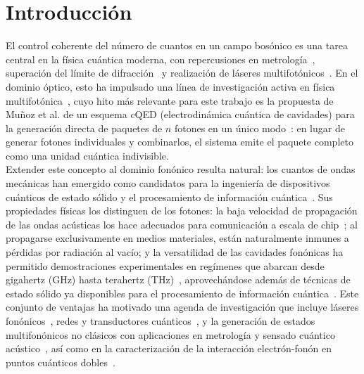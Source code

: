 \chapter{Introducción}

El control coherente del número de cuantos en un campo bosónico es una tarea central en la física cuántica moderna, con repercusiones en metrología~\cite{afek2010}, superación del límite de difracción~\cite{dangelo2001} y realización de láseres multifotónicos~\cite{gauthier1992}. En el dominio óptico, esto ha impulsado una línea de investigación activa en física multifotónica~\cite{kubanek2008,ota2011,gonzaleztudela2013,munoz2014,chang2016,kockum2017}, cuyo hito más relevante para este trabajo es la propuesta de Muñoz et al. de un esquema cQED (electrodinámica cuántica de cavidades) para la generación directa de paquetes de $n$ fotones en un único modo~\cite{munoz2014}: en lugar de generar fotones individuales y combinarlos, el sistema emite el paquete completo como una unidad cuántica indivisible. \\

Extender este concepto al dominio fonónico resulta natural: los cuantos de ondas mecánicas han emergido como candidatos para la ingeniería de dispositivos cuánticos de estado sólido y el procesamiento de información cuántica~\cite{balandin2005,schuetz2015,manenti2017,noguchi2017,arrangoiz2018,zhang2018}. Sus propiedades físicas los distinguen de los fotones: la baja velocidad de propagación de las ondas acústicas los hace adecuados para comunicación a escala de chip~\cite{gustafsson2014,kuzyk2018}; al propagarse exclusivamente en medios materiales, están naturalmente inmunes a pérdidas por radiación al vacío; y la versatilidad de las cavidades fonónicas ha permitido demostraciones experimentales en regímenes que abarcan desde gigahertz (GHz) hasta terahertz (THz)~\cite{weig2004,rozas2009,soykal2011,fainstein2013,xu2018,kharel2018,oconnell2010,macCabe2020,bolgar2018,wigger2021,kettler2021,chu2017,pirkkalainen2013,gokhale2020,zalalutdinov2021}, aprovechándose además de técnicas de estado sólido ya disponibles para el procesamiento de información cuántica~\cite{ask2019,akimov2017,manenti2017,wan2021}. Este conjunto de ventajas ha motivado una agenda de investigación que incluye láseres fonónicos~\cite{kabuss2012,maryam2013,han2015,droenner2017}, redes y transductores cuánticos~\cite{lemonde2018,calajo2019,schuetz2015,noguchi2017,arrangoiz2018}, y la generación de estados multifonónicos no clásicos con aplicaciones en metrología y sensado cuántico acústico~\cite{zhang2018,chu2018,satzinger2018,toyoda2015}, así como en la caracterización de la interacción electrón-fonón en puntos cuánticos dobles~\cite{hartke2018,gullans2018}.\\


